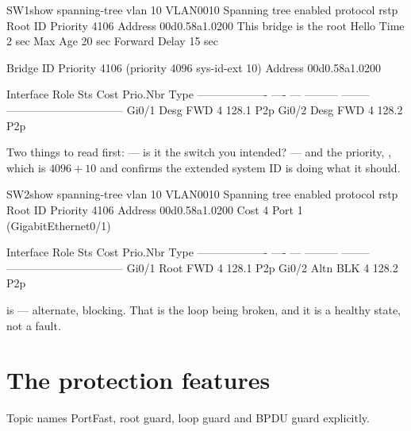 \begin{verify}{SW1}{show spanning-tree vlan 10}
VLAN0010
  Spanning tree enabled protocol rstp
  Root ID    Priority    4106
             Address     00d0.58a1.0200
             This bridge is the root
             Hello Time  2 sec  Max Age 20 sec  Forward Delay 15 sec

  Bridge ID  Priority    4106   (priority 4096 sys-id-ext 10)
             Address     00d0.58a1.0200

Interface           Role Sts Cost      Prio.Nbr Type
------------------- ---- --- --------- -------- --------------------------------
Gi0/1               Desg FWD 4         128.1    P2p
Gi0/2               Desg FWD 4         128.2    P2p
\end{verify}

Two things to read first:  --- is it the switch you
intended? --- and the priority, , which is $4096+10$ and confirms the
extended system ID is doing what it should.

\begin{verify}{SW2}{show spanning-tree vlan 10}
VLAN0010
  Spanning tree enabled protocol rstp
  Root ID    Priority    4106
             Address     00d0.58a1.0200
             Cost        4
             Port        1 (GigabitEthernet0/1)

Interface           Role Sts Cost      Prio.Nbr Type
------------------- ---- --- --------- -------- --------------------------------
Gi0/1               Root FWD 4         128.1    P2p
Gi0/2               Altn BLK 4         128.2    P2p
\end{verify}

 is  --- alternate, blocking. That is the loop being
broken, and it is a healthy state, not a fault.

\section{The protection features}

Topic  names PortFast, root guard, loop guard and BPDU guard explicitly.

